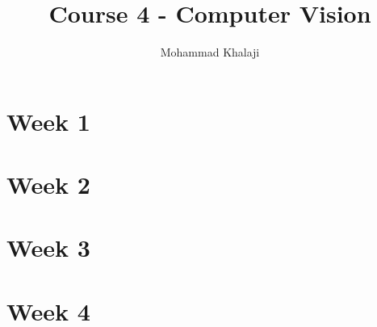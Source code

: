 \documentclass[10pt,a4paper]{article}
\author{Mohammad Khalaji}
\title{Course 4 - Computer Vision}
\begin{document}
\maketitle
\section{Week 1}

\newpage
\section{Week 2}

\newpage
\section{Week 3}

\newpage
\section{Week 4}

\end{document}
